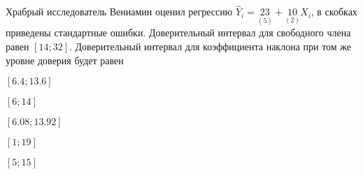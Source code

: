 
\begin{question}
Храбрый исследователь Вениамин оценил регрессию \(\hat Y_i = \underset{(5)}{23} + \underset{(2)}{10}X_i\),
в скобках приведены стандартные ошибки.
Доверительный интервал для свободного члена равен \([14; 32]\).
Доверительный интервал для коэффициента наклона при том же уровне доверия будет равен
\begin{answerlist}
  \item \([6.4; 13.6]\)
  \item \([6; 14]\)
  \item \([6.08; 13.92]\)
  \item \([1; 19]\)
  \item \([5; 15]\)
\end{answerlist}
\end{question}


